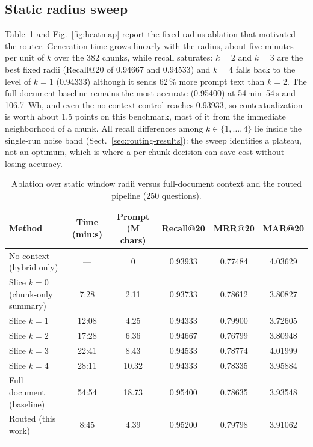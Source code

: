\documentclass[pdflatex,sn-mathphys-num]{sn-jnl}
\makeatletter
\newcommand{\Rec}[1]{Recall@#1}
\newcommand{\MRR}[1]{MRR@#1}
\newcommand{\MAR}[1]{MAR@#1}
\theoremstyle{thmstyleone}%
\theoremstyle{thmstylethree}%
\makeatother
\begin{document}
\subsection{Static radius sweep}\label{sec:static}

Table~\ref{tab:sweep} and Fig.~\ref{fig:heatmap} report the fixed-radius ablation that motivated the router. Generation time grows linearly with the radius, about five minutes per unit of $k$ over the 382 chunks, while recall saturates: $k=2$ and $k=3$ are the best fixed radii (\Rec{20} of 0.94667 and 0.94533) and $k=4$ falls back to the level of $k=1$ (0.94333) although it sends 62\,\% more prompt text than $k=2$. The full-document baseline remains the most accurate (0.95400) at 54\,min~54\,s and 106.7\, Wh, and even the no-context control reaches 0.93933, so contextualization is worth about 1.5 points on this benchmark, most of it from the immediate neighborhood of a chunk. All recall differences among $k\in\{1,\dots,4\}$ lie inside the single-run noise band (Sect.~\ref{sec:routing-results}): the sweep identifies a plateau, not an optimum, which is where a per-chunk decision can save cost without losing accuracy.

\begin{table}[htbp]
\caption{Ablation over static window radii versus full-document context and the routed pipeline (250 questions).}\label{tab:sweep}
\setlength{\tabcolsep}{4pt}
\begin{tabular}{@{}p{3.7cm}ccccc@{}}
\toprule
Method & Time (min:s) & Prompt (M chars) & \Rec{20} & \MRR{20} & \MAR{20} \\
\midrule
No context (hybrid only) & --- & 0 & 0.93933 & 0.77484 & 4.03629 \\
Slice $k=0$ (chunk-only summary) & 7:28\footnotemark[1] & 2.11 & 0.93733 & 0.78612 & 3.80827 \\
Slice $k=1$ & 12:08\footnotemark[1] & 4.25 & 0.94333 & 0.79900 & 3.72605 \\
Slice $k=2$ & 17:28\footnotemark[1] & 6.36 & 0.94667 & 0.76799 & 3.80948 \\
Slice $k=3$ & 22:41\footnotemark[1] & 8.43 & 0.94533 & 0.78774 & 4.01999 \\
Slice $k=4$ & 28:11\footnotemark[1] & 10.32 & 0.94333 & 0.78335\footnotemark[2] & 3.95884 \\
Full document (baseline) & 54:54 & 18.73 & 0.95400 & 0.78635 & 3.93548 \\
Routed (this work) & 8:45 & 4.39 & 0.95200 & 0.79798 & 3.91062 \\
\botrule
\end{tabular}
\end{table}
\end{document}
